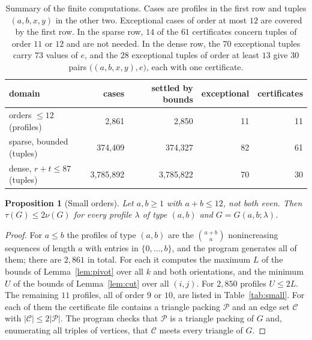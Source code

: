 \documentclass{amsart}
\newtheorem{proposition}[theorem]{Proposition}
\theoremstyle{definition}
\numberwithin{equation}{section}
\numberwithin{table}{section}
\begin{document}
\begin{table}[H]
\caption{Summary of the finite computations. Cases are profiles in the first row and tuples $(a,b,x,y)$ in the other two. Exceptional cases of order at most $12$ are covered by the first row. In the sparse row, $14$ of the $61$ certificates concern tuples of order $11$ or $12$ and are not needed. In the dense row, the $70$ exceptional tuples carry $73$ values of $e$, and the $28$ exceptional tuples of order at least $13$ give $30$ pairs $\bigl((a,b,x,y),e\bigr)$, each with one certificate.}\label{tab:summary}
\centering
\vspace{6pt}
\small
\begin{tabular}{@{}lrrrr@{}}
\toprule
domain & cases & settled by bounds & exceptional & certificates\\
\midrule
orders $\le 12$ (profiles) & 2,861 & 2,850 & 11 & 11\\
sparse, bounded (tuples) & 374,409 & 374,327 & 82 & 61\\
dense, $r+t\le 87$ (tuples) & 3,785,892 & 3,785,822 & 70 & 30\\
\bottomrule
\end{tabular}
\end{table}

\begin{proposition}[Small orders]\label{prop:small}
Let $a,b\ge 1$ with $a+b\le 12$, not both even. Then $\tau(G)\le 2\nu(G)$ for every profile $\lambda$ of type $(a,b)$ and $G=G(a,b;\lambda)$.
\end{proposition}

\begin{proof}
For $a\le b$ the profiles of type $(a,b)$ are the $\binom{a+b}{a}$ nonincreasing sequences of length $a$ with entries in $\{0,\dots,b\}$, and the program generates all of them; there are $2{,}861$ in total. For each it computes the maximum $L$ of the bounds of Lemma~\ref{lem:pivot} over all $k$ and both orientations, and the minimum $U$ of the bounds of Lemma~\ref{lem:cut} over all $(i,j)$. For $2{,}850$ profiles $U\le 2L$. The remaining $11$ profiles, all of order $9$ or $10$, are listed in Table~\ref{tab:small}. For each of them the certificate file contains a triangle packing $\mathcal P$ and an edge set $\mathcal C$ with $|\mathcal C|\le 2|\mathcal P|$. The program checks that $\mathcal P$ is a triangle packing of $G$ and, enumerating all triples of vertices, that $\mathcal C$ meets every triangle of $G$.
\end{proof}
\end{document}
